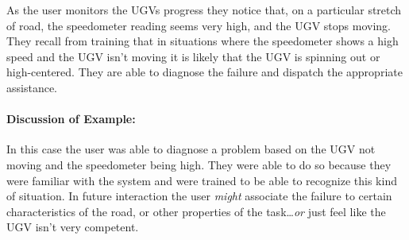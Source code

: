 As the user monitors the UGVs progress they notice that, on a particular stretch of road, the speedometer reading seems very high, and the UGV stops moving. They recall from training that in situations where the speedometer shows a high speed and the UGV isn't moving it is likely that the UGV is spinning out or high-centered. They are able to diagnose the failure and dispatch the appropriate assistance.

\paragraph{\textbf{Discussion of Example:}} In this case the user was able to diagnose a problem based on the UGV not moving and the speedometer being high. They were able to do so because they were familiar with the system and were trained to be able to recognize this kind of situation. In future interaction the user \emph{might} associate the failure to certain characteristics of the road, or other properties of the task\ldots \emph{or} just feel like the UGV isn't very competent.

